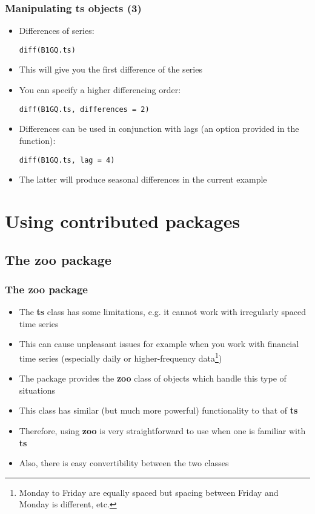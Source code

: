 \documentclass[10pt]{beamer}
\theoremstyle{definition}
\begin{document}
\begin{frame}[fragile]
\frametitle{Manipulating \textbf{ts} objects (3)}
\begin{itemize}
	\item Differences of series:
	
	\begin{lstlisting}[style = rstyle, breaklines]
	diff(B1GQ.ts)
	\end{lstlisting}
	
	\item This will give you the first difference of the series
	
	\item You can specify a higher differencing order:
	
	\begin{lstlisting}[style = rstyle, breaklines]
	diff(B1GQ.ts, differences = 2)
	\end{lstlisting}
	
	\item Differences can be used in conjunction with lags (an option provided in the function):

	\begin{lstlisting}[style = rstyle, breaklines]
	diff(B1GQ.ts, lag = 4)
	\end{lstlisting}
	
	\item The latter will produce seasonal differences in the current example
\end{itemize}
\end{frame}

\section{Using contributed packages}
\subsection{The zoo package}
\begin{frame}[fragile]
\frametitle{The \textbf{zoo} package}
\begin{itemize}
	\item The \textbf{ts} class has some limitations, e.g. it cannot work with irregularly spaced time series
	\item This can cause unpleasant issues for example when you work with financial time series (especially daily or higher-frequency data\footnote{Monday to Friday are equally spaced but spacing between Friday and Monday is different, etc.})
	\item The package provides the \textbf{zoo} class of objects which handle this type of situations
	\item This class has similar (but much more powerful) functionality to that of \textbf{ts}
	\item Therefore, using \textbf{zoo} is very straightforward to use when one is familiar with \textbf{ts}
	\item Also, there is easy convertibility between the two classes
\end{itemize}
\end{frame}
\end{document}

